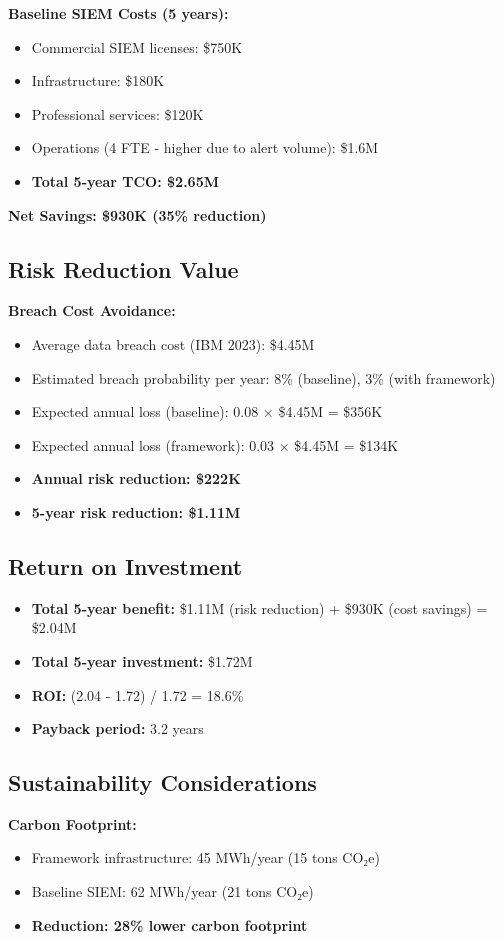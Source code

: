 \textbf{Baseline SIEM Costs (5 years):}
\begin{itemize}
    \item Commercial SIEM licenses: \$750K
    \item Infrastructure: \$180K
    \item Professional services: \$120K
    \item Operations (4 FTE - higher due to alert volume): \$1.6M
    \item \textbf{Total 5-year TCO: \$2.65M}
\end{itemize}

\textbf{Net Savings: \$930K (35\% reduction)}

\subsection{Risk Reduction Value}
\textbf{Breach Cost Avoidance:}
\begin{itemize}
    \item Average data breach cost (IBM 2023): \$4.45M
    \item Estimated breach probability per year: 8\% (baseline), 3\% (with framework)
    \item Expected annual loss (baseline): 0.08 × \$4.45M = \$356K
    \item Expected annual loss (framework): 0.03 × \$4.45M = \$134K
    \item \textbf{Annual risk reduction: \$222K}
    \item \textbf{5-year risk reduction: \$1.11M}
\end{itemize}

\subsection{Return on Investment}
\begin{itemize}
    \item \textbf{Total 5-year benefit:} \$1.11M (risk reduction) + \$930K (cost savings) = \$2.04M
    \item \textbf{Total 5-year investment:} \$1.72M
    \item \textbf{ROI:} (2.04 - 1.72) / 1.72 = 18.6\%
    \item \textbf{Payback period:} 3.2 years
\end{itemize}

\subsection{Sustainability Considerations}
\textbf{Carbon Footprint:}
\begin{itemize}
    \item Framework infrastructure: 45 MWh/year (15 tons CO₂e)
    \item Baseline SIEM: 62 MWh/year (21 tons CO₂e)
    \item \textbf{Reduction: 28\% lower carbon footprint}
\end{itemize}

